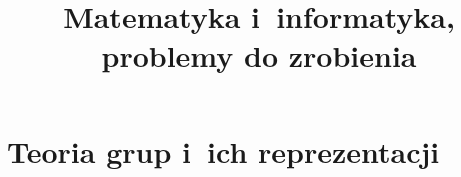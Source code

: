 \documentclass[a4paper,11pt]{article}
\title{Matematyka i~informatyka, problemy do zrobienia}
\begin{document}





\maketitle  %





\section{Teoria grup i~ich reprezentacji}


\end{document}
